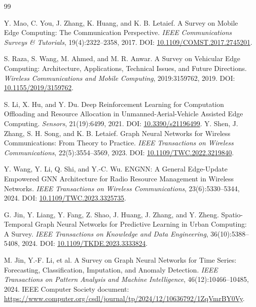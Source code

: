 \documentclass[letterpaper,journal]{IEEEtran}
\begin{document}
\begin{thebibliography}{99}

Y. Mao, C. You, J. Zhang, K. Huang, and K. B. Letaief.
\newblock A Survey on Mobile Edge Computing: The Communication Perspective.
\newblock \textit{IEEE Communications Surveys \& Tutorials}, 19(4):2322--2358, 2017.
\newblock DOI: \href{https://doi.org/10.1109/COMST.2017.2745201}{10.1109/COMST.2017.2745201}.

S. Raza, S. Wang, M. Ahmed, and M. R. Anwar.
\newblock A Survey on Vehicular Edge Computing: Architecture, Applications, Technical Issues, and Future Directions.
\newblock \textit{Wireless Communications and Mobile Computing}, 2019:3159762, 2019.
\newblock DOI: \href{https://doi.org/10.1155/2019/3159762}{10.1155/2019/3159762}.

S. Li, X. Hu, and Y. Du.
\newblock Deep Reinforcement Learning for Computation Offloading and Resource Allocation in Unmanned-Aerial-Vehicle Assisted Edge Computing.
\newblock \textit{Sensors}, 21(19):6499, 2021.
\newblock DOI: \href{https://doi.org/10.3390/s21196499}{10.3390/s21196499}.
Y. Shen, J. Zhang, S. H. Song, and K. B. Letaief.
\newblock Graph Neural Networks for Wireless Communications: From Theory to Practice.
\newblock \textit{IEEE Transactions on Wireless Communications}, 22(5):3554--3569, 2023.
\newblock DOI: \href{https://doi.org/10.1109/TWC.2022.3219840}{10.1109/TWC.2022.3219840}.

Y. Wang, Y. Li, Q. Shi, and Y.-C. Wu.
\newblock ENGNN: A General Edge-Update Empowered GNN Architecture for Radio Resource Management in Wireless Networks.
\newblock \textit{IEEE Transactions on Wireless Communications}, 23(6):5330--5344, 2024.
\newblock DOI: \href{https://doi.org/10.1109/TWC.2023.3325735}{10.1109/TWC.2023.3325735}.

G. Jin, Y. Liang, Y. Fang, Z. Shao, J. Huang, J. Zhang, and Y. Zheng.
\newblock Spatio-Temporal Graph Neural Networks for Predictive Learning in Urban Computing: A Survey.
\newblock \textit{IEEE Transactions on Knowledge and Data Engineering}, 36(10):5388--5408, 2024.
\newblock DOI: \href{https://doi.org/10.1109/TKDE.2023.3333824}{10.1109/TKDE.2023.3333824}.

M. Jin, Y.-F. Li, et al.
\newblock A Survey on Graph Neural Networks for Time Series: Forecasting, Classification, Imputation, and Anomaly Detection.
\newblock \textit{IEEE Transactions on Pattern Analysis and Machine Intelligence}, 46(12):10466--10485, 2024.
\newblock IEEE Computer Society document: \url{https://www.computer.org/csdl/journal/tp/2024/12/10636792/1ZqVmrBY0Vy}.


\end{thebibliography}
\end{document}
